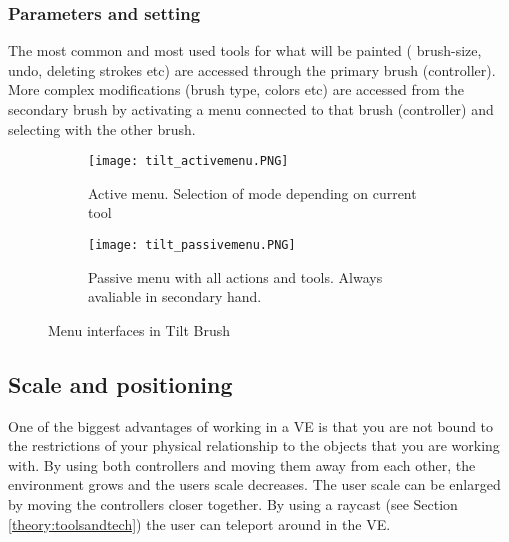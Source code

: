 \subsubsection{Parameters and setting}
The most common and most used tools for what will be painted ( brush-size, undo, deleting strokes etc) are accessed through the primary brush (controller). More complex modifications (brush type, colors etc) are accessed from the secondary brush by activating a menu connected to that brush (controller) and selecting with the other brush.
\begin{figure}
\begin{subfigure}{.5\textwidth}
  \centering
  \texttt{[image: tilt\_activemenu.PNG]}
  \caption{Active menu. Selection of mode depending on current tool}
  \label{fig:sfig1:tilt_activemenu}
\end{subfigure}%
\begin{subfigure}{.5\textwidth}
  \centering
  \texttt{[image: tilt\_passivemenu.PNG]}
  \caption{Passive menu with all actions and tools. Always avaliable in secondary hand. }
  \label{fig:sfig2:tilt_activemenu}
\end{subfigure}
\caption{Menu interfaces in Tilt Brush}
\label{fig:fig:tilt_menu}
\end{figure}
\subsection{Scale and positioning}
One of the biggest advantages of working in a VE is that you are not bound to the restrictions of your physical relationship to the objects that you are working with. By using both controllers and moving them away from each other, the environment grows and the users scale decreases. The user scale can be enlarged by moving the controllers closer together.
By using a raycast (see Section \ref{theory:toolsandtech}) the user can teleport around in the VE.

